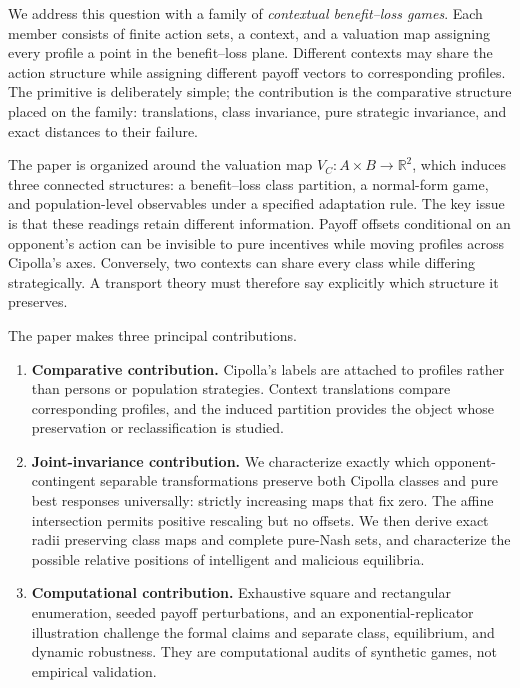 \documentclass[a4paper,fleqn]{cas-dc}
\theoremstyle{remark}
\newcommand{\R}{\mathbb{R}}
\begin{document}
We address this question with a family of \emph{contextual benefit--loss games}. Each member consists of finite action sets, a context, and a valuation map assigning every profile a point in the benefit--loss plane. Different contexts may share the action structure while assigning different payoff vectors to corresponding profiles. The primitive is deliberately simple; the contribution is the comparative structure placed on the family: translations, class invariance, pure strategic invariance, and exact distances to their failure.

The paper is organized around the valuation map $V_C:A\times B\to\R^2$, which induces three connected structures: a benefit--loss class partition, a normal-form game, and population-level observables under a specified adaptation rule. The key issue is that these readings retain different information. Payoff offsets conditional on an opponent's action can be invisible to pure incentives while moving profiles across Cipolla's axes. Conversely, two contexts can share every class while differing strategically. A transport theory must therefore say explicitly which structure it preserves.

The paper makes three principal contributions.
\begin{enumerate}[label=(\roman*)]
    \item \textbf{Comparative contribution.} Cipolla's labels are attached to profiles rather than persons or population strategies. Context translations compare corresponding profiles, and the induced partition provides the object whose preservation or reclassification is studied.
    \item \textbf{Joint-invariance contribution.} We characterize exactly which opponent-contingent separable transformations preserve both Cipolla classes and pure best responses universally: strictly increasing maps that fix zero. The affine intersection permits positive rescaling but no offsets. We then derive exact radii preserving class maps and complete pure-Nash sets, and characterize the possible relative positions of intelligent and malicious equilibria.
    \item \textbf{Computational contribution.} Exhaustive square and rectangular enumeration, seeded payoff perturbations, and an exponential-replicator illustration challenge the formal claims and separate class, equilibrium, and dynamic robustness. They are computational audits of synthetic games, not empirical validation.
\end{enumerate}
\end{document}

